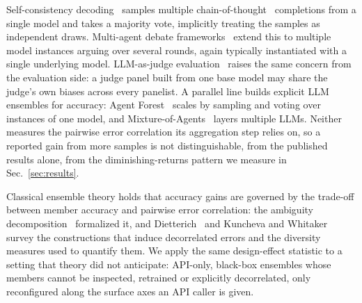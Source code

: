 \documentclass[conference]{IEEEtran}
\begin{document}
Self-consistency decoding~\cite{wang2023selfconsistency} samples multiple
chain-of-thought~\cite{wei2022cot} completions from a single model and
takes a majority vote, implicitly treating the samples as independent
draws. Multi-agent debate frameworks~\cite{du2023debate} extend this to
multiple model instances arguing over several rounds, again typically
instantiated with a single underlying model. LLM-as-judge
evaluation~\cite{zheng2023judging} raises the same concern from the
evaluation side: a judge panel built from one base model may share the
judge's own biases across every panelist. A parallel line builds explicit LLM ensembles for accuracy: Agent
Forest~\cite{li2024moreagents} scales by sampling and voting over instances
of one model, and Mixture-of-Agents~\cite{wang2024moa} layers multiple LLMs.
Neither measures the pairwise error correlation its aggregation step relies
on, so a reported gain from more samples is not distinguishable, from the
published results alone, from the diminishing-returns pattern we measure in
Sec.~\ref{sec:results}.

Classical ensemble theory holds that accuracy gains are governed by the
trade-off between member accuracy and pairwise error correlation: the
ambiguity decomposition~\cite{krogh1994ambiguity} formalized it, and
Dietterich~\cite{dietterich2000ensemble} and Kuncheva and
Whitaker~\cite{kuncheva2003diversity} survey the constructions that induce
decorrelated errors and the diversity measures used to quantify them. We apply the same design-effect statistic to a setting that
theory did not anticipate: API-only, black-box ensembles whose members
cannot be inspected, retrained or explicitly decorrelated, only reconfigured
along the surface axes an API caller is given.
\end{document}
